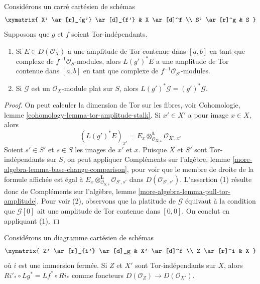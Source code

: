 \begin{lemma}
\label{lemma-tor-independence-and-tor-amplitude}
Considérons un carré cartésien de schémas
$$
\xymatrix{
X' \ar[r]_{g'} \ar[d]_{f'} & X \ar[d]^f \\
S' \ar[r]^g & S
}
$$
Supposons que $g$ et $f$ soient Tor-indépendants.
\begin{enumerate}
\item Si $E \in D(\mathcal{O}_X)$ a une amplitude de Tor
contenue dans $[a, b]$ en tant que complexe de $f^{-1}\mathcal{O}_S$-modules,
alors $L(g')^*E$ a une amplitude de Tor
contenue dans $[a, b]$ en tant que complexe de $f^{-1}\mathcal{O}_{S'}$-modules.
\item Si $\mathcal{G}$ est un $\mathcal{O}_X$-module plat
sur $S$, alors $L(g')^*\mathcal{G} = (g')^*\mathcal{G}$.
\end{enumerate}
\end{lemma}

\begin{proof}
On peut calculer la dimension de Tor sur les fibres, voir
Cohomologie, lemme \ref{cohomology-lemma-tor-amplitude-stalk}.
Si $x' \in X'$ a pour image $x \in X$, alors
$$
(L(g')^*E)_{x'} =
E_x \otimes_{\mathcal{O}_{X, x}}^\mathbf{L} \mathcal{O}_{X', x'}
$$
Soient $s' \in S'$ et $s \in S$ les images de $x'$ et $x$.
Puisque $X$ et $S'$ sont Tor-indépendants sur $S$, on peut appliquer
Compléments sur l'algèbre, lemme \ref{more-algebra-lemma-base-change-comparison},
pour voir que le membre de droite de la formule affichée est égal à
$E_x \otimes_{\mathcal{O}_{S, s}}^\mathbf{L} \mathcal{O}_{S', s'}$
dans $D(\mathcal{O}_{S', s'})$.
L'assertion (1) résulte donc de
Compléments sur l'algèbre, lemme \ref{more-algebra-lemma-pull-tor-amplitude}.
Pour voir (2), observons que la platitude de $\mathcal{G}$ équivaut à
la condition que $\mathcal{G}[0]$ ait une amplitude de Tor contenue dans $[0, 0]$.
On conclut en appliquant (1).
\end{proof}

\begin{lemma}
\label{lemma-compare-base-change-closed-immersion}
Considérons un diagramme cartésien de schémas
$$
\xymatrix{
Z' \ar[r]_{i'} \ar[d]_g & X' \ar[d]^f \\
Z \ar[r]^i & X
}
$$
où $i$ est une immersion fermée. Si $Z$ et $X'$ sont
Tor-indépendants sur $X$, alors $Ri'_* \circ Lg^* = Lf^* \circ Ri_*$
comme foncteurs $D(\mathcal{O}_Z) \to D(\mathcal{O}_{X'})$.
\end{lemma}

